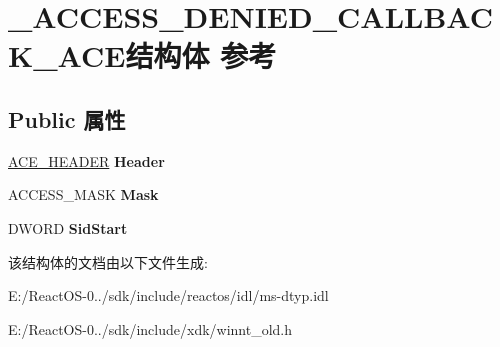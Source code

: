 \hypertarget{struct___a_c_c_e_s_s___d_e_n_i_e_d___c_a_l_l_b_a_c_k___a_c_e}{}\section{\+\_\+\+A\+C\+C\+E\+S\+S\+\_\+\+D\+E\+N\+I\+E\+D\+\_\+\+C\+A\+L\+L\+B\+A\+C\+K\+\_\+\+A\+C\+E结构体 参考}
\label{struct___a_c_c_e_s_s___d_e_n_i_e_d___c_a_l_l_b_a_c_k___a_c_e}
\subsection*{Public 属性}
\begin{DoxyCompactItemize}
\item 
\mbox{\label{struct___a_c_c_e_s_s___d_e_n_i_e_d___c_a_l_l_b_a_c_k___a_c_e_abb9ca4870f4e368d354392dd5aa1c8a3}} 
\hyperlink{struct___a_c_e___h_e_a_d_e_r}{A\+C\+E\+\_\+\+H\+E\+A\+D\+ER} {\bfseries Header}
\item 
\mbox{\label{struct___a_c_c_e_s_s___d_e_n_i_e_d___c_a_l_l_b_a_c_k___a_c_e_ab6cfe13762153491f52a399c7e937b05}} 
A\+C\+C\+E\+S\+S\+\_\+\+M\+A\+SK {\bfseries Mask}
\item 
\mbox{\label{struct___a_c_c_e_s_s___d_e_n_i_e_d___c_a_l_l_b_a_c_k___a_c_e_a24821045181cac090e70189524498c67}} 
D\+W\+O\+RD {\bfseries Sid\+Start}
\end{DoxyCompactItemize}


该结构体的文档由以下文件生成\+:\begin{DoxyCompactItemize}
\item 
E\+:/\+React\+O\+S-\/0../sdk/include/reactos/idl/ms-\/dtyp.\+idl\item 
E\+:/\+React\+O\+S-\/0../sdk/include/xdk/winnt\+\_\+old.\+h\end{DoxyCompactItemize}
